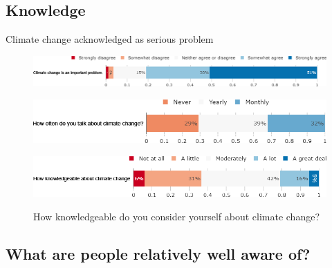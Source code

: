 \begin{framefont}{\small}


\section{Knowledge}

\begin{frame}{Climate change acknowledged as serious problem}%
	\begin{figure}[h!]
	\centering
	\caption{Do you agree or disagree with the following statement: ``Climate change is an important problem."}
	\includegraphics[width=.78\paperwidth]{../figures/FR/CC_problem_FR.png}
	\caption{How often do you think or talk with people about climate change?}
	\includegraphics[width=.61\paperwidth]{../figures/FR/CC_talks_FR.png}\\
	\centering
	\caption{How knowledgeable do you consider yourself about climate change?}
	\includegraphics[width=.7\paperwidth]{../figures/FR/CC_knowledgeable_FR.png}
	\\
	\end{figure}
\end{frame}

\subsection{What are people relatively well aware of?}


\end{framefont}
